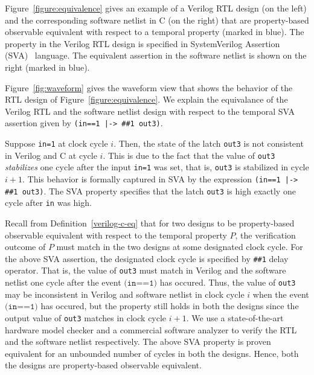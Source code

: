 \begin{example}
%
Figure~\ref{figure:equivalence} gives an example of a Verilog RTL design 
(on the left) and the corresponding software netlist in C (on the right) that are 
property-based observable equivalent with respect to a temporal 
property (marked in blue).  The property in the Verilog RTL design 
is specified in SystemVerilog Assertion (SVA)~\cite{SVA} language.  
The equivalent assertion in the software netlist is shown on the right (marked in blue).  


Figure~\ref{fig:waveform} gives the waveform view that shows the behavior 
of the RTL design of Figure~\ref{figure:equivalence}. 
% 
We explain the equivalance of the Verilog RTL and the 
software netlist design with respect to the temporal SVA 
assertion given by \texttt{(in==1 |-> \#\#1 out3)}.  
%


Suppose \texttt{in=1} at clock cycle $i$.  Then, the state of 
the latch \texttt{out3} is not consistent in Verilog and C at 
cycle $i$.  This is due to the fact that 
the value of \texttt{out3} \emph{stabilizes} one cycle after the 
input \texttt{in=1} was set, that is, \texttt{out3} is stabilized in cycle $i+1$.  
This behavior is formally captured 
in SVA by the expression \texttt{(in==1 |-> \#\#1 out3)}.  
The SVA property specifies that the latch \texttt{out3} is high 
exactly one cycle after \texttt{in} was high.  
%

Recall from Definition~\ref{verilog-c-eq} that for two designs to be 
property-based observable equivalent with respect to the temporal 
property $P$,  the verification outcome of $P$ must match in the 
two designs at some designated clock cycle. 
% 
For the above SVA assertion, the designated clock cycle is specified 
by \texttt{\#\#1} delay operator.  That is, the value of \texttt{out3} 
must match in Verilog and the software netlist one cycle after the 
event $\texttt{(in==1)}$ has occured. 
% 
Thus, the value of \texttt{out3} may be inconsistent in Verilog and software netlist 
in clock cycle $i$ when the event $\texttt{(in==1)}$ has occured, but 
the property still holds in both the designs since the output value of 
\texttt{out3} matches in clock cycle $i+1$. 
% 
We use a state-of-the-art hardware model checker and a commercial 
software analyzer to verify the RTL and the software netlist respectively.  
The above SVA property is proven equivalent for an unbounded number of cycles in 
both the designs.  Hence, both the designs are property-based observable equivalent.
\end{example}
